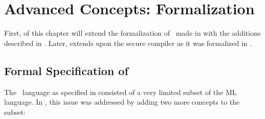 \chapter{Advanced Concepts: Formalization}
\label{chap:FormalizationOfAdvancedConcepts}
First,  of this chapter will extend the formalization of \MiniML\ made in  with the additions described in .
Later,  extends upon the secure compiler as it was formalized in .

\section{Formal Specification of \MiniML}
\label{sec:formalspec2}
The \MiniML\ language as specified in  consisted of a very limited subset of the ML language.
In , this issue was addressed by adding two more concepts to the subset:
